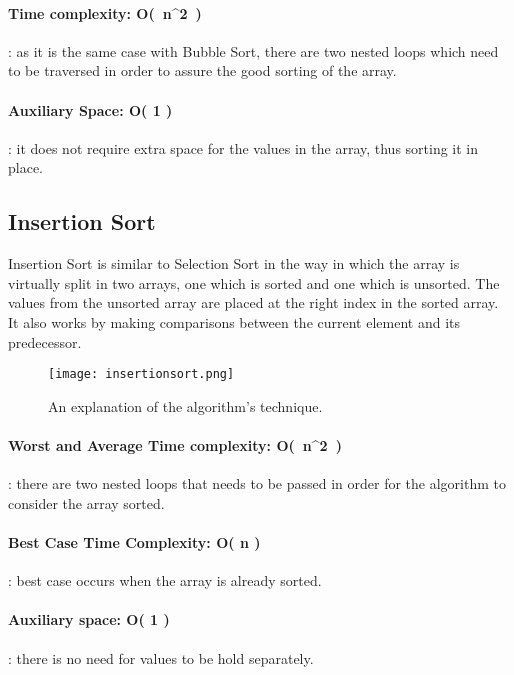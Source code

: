 \documentclass{article}
\begin{document}
\paragraph{Time complexity: O(\ n^2\ )}: as it is the same case with Bubble Sort, there are two nested loops which need to be traversed in order to assure the good sorting of the array.

\paragraph{Auxiliary Space: O( 1 )}: it does not require extra space for the values in the array, thus sorting it in place.


\subsection{Insertion Sort}

Insertion Sort is similar to Selection Sort in the way in which the array is virtually split in
two arrays, one which is sorted and one which is unsorted. The values from the
unsorted array are placed at the right index in the sorted array. It also works by making
comparisons between the current element and its predecessor.


\begin{figure}[h!]
\centering
\texttt{[image: insertionsort.png]}
\caption{\label{fig:insertionsort} An explanation of the algorithm's technique.}
\end{figure}

\paragraph{Worst and Average Time complexity: O(\ n^2\ )}: there are two nested loops that
needs to be passed in order for the algorithm to consider the array sorted.

\paragraph{Best Case Time Complexity: O( n )}: best case occurs when the array is already sorted.

\paragraph{Auxiliary space: O( 1 )}: there is no need for values to be hold separately.
\newline
\end{document}
